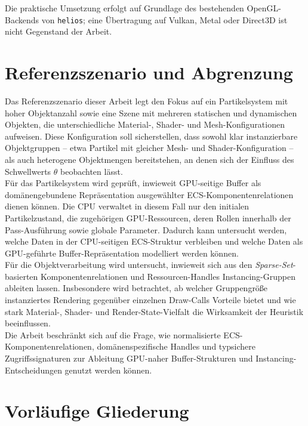 Die praktische Umsetzung erfolgt auf Grundlage des bestehenden OpenGL-Backends von \texttt{helios}; eine Übertragung auf Vulkan, Metal oder Direct3D ist nicht Gegenstand der Arbeit.

\section{Referenzszenario und Abgrenzung}

Das Referenzszenario dieser Arbeit legt den Fokus auf ein Partikelsystem mit hoher Objektanzahl sowie eine Szene mit mehreren statischen und dynamischen Objekten, die unterschiedliche Material-, Shader- und Mesh-Konfigurationen aufweisen.
Diese Konfiguration soll sicherstellen, dass sowohl klar instanzierbare Objektgruppen -- etwa Partikel mit gleicher Mesh- und Shader-Konfiguration -- als auch heterogene Objektmengen bereitstehen, an denen sich der Einfluss des Schwellwerts \(\theta\) beobachten lässt.\\

Für das Partikelsystem wird geprüft, inwieweit GPU-seitige Buffer als domänengebundene Repräsentation ausgewählter ECS-Komponentenrelationen dienen können.
Die CPU verwaltet in diesem Fall nur den initialen Partikelzustand, die zugehörigen GPU-Ressourcen, deren Rollen innerhalb der Pass-Ausführung sowie globale Parameter.
Dadurch kann untersucht werden, welche Daten in der CPU-seitigen ECS-Struktur verbleiben und welche Daten als GPU-geführte Buffer-Repräsentation modelliert werden können.\\

Für die Objektverarbeitung wird untersucht, inwieweit sich aus den \textit{Sparse-Set}-basierten Komponentenrelationen und Ressourcen-Handles Instancing-Gruppen ableiten lassen.
Insbesondere wird betrachtet, ab welcher Gruppengröße instanziertes Rendering gegenüber einzelnen Draw-Calls Vorteile bietet und wie stark Material-, Shader- und Render-State-Vielfalt die Wirksamkeit der Heuristik beeinflussen.\\


Die Arbeit beschränkt sich auf die Frage, wie normalisierte ECS-Komponentenrelationen, domänenspezifische Handles und typsichere Zugriffssignaturen zur Ableitung GPU-naher Buffer-Strukturen und Instancing-Entscheidungen genutzt werden können.

\section{Vorläufige Gliederung}

